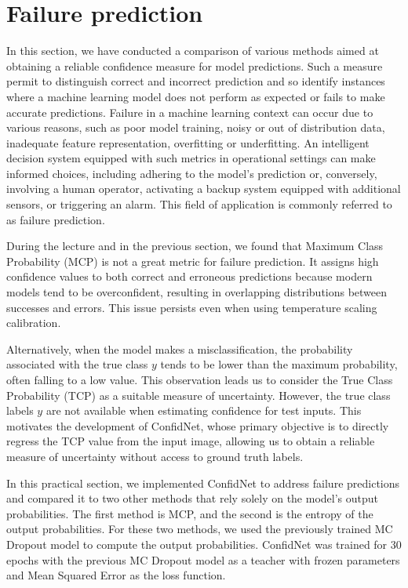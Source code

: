 \section{Failure prediction}
In this section, we have conducted a comparison of various methods aimed at obtaining a reliable confidence measure for model predictions. Such a measure permit to distinguish correct and incorrect prediction and so identify instances where a machine learning model does not perform as expected or fails to make accurate predictions. Failure in a machine learning context can occur due to various reasons, such as poor model training, noisy or out of distribution data, inadequate feature representation, overfitting or underfitting. An intelligent decision system equipped with such metrics in operational settings can make informed choices, including adhering to the model's prediction or, conversely, involving a human operator, activating a backup system equipped with additional sensors, or triggering an alarm. This field of application is commonly referred to as failure prediction.

During the lecture and in the previous section, we found that Maximum Class Probability (MCP) is not a great metric for failure prediction. It assigns high confidence values to both correct and erroneous predictions because modern models tend to be overconfident, resulting in overlapping distributions between successes and errors. This issue persists even when using temperature scaling calibration.

Alternatively, when the model makes a misclassification, the probability associated with the true class $y$ tends to be lower than the maximum probability, often falling to a low value. This observation leads us to consider the True Class Probability (TCP) as a suitable measure of uncertainty. However, the true class labels $y$ are not available when estimating confidence for test inputs. This motivates the development of ConfidNet, whose primary objective is to directly regress the TCP value from the input image, allowing us to obtain a reliable measure of uncertainty without access to ground truth labels.

In this practical section, we implemented ConfidNet to address failure predictions and compared it to two other methods that rely solely on the model's output probabilities. The first method is MCP, and the second is the entropy of the output probabilities. For these two methods, we used the previously trained MC Dropout model to compute the output probabilities. ConfidNet was trained for 30 epochs with the previous MC Dropout model as a teacher with frozen parameters and Mean Squared Error as the loss function.

